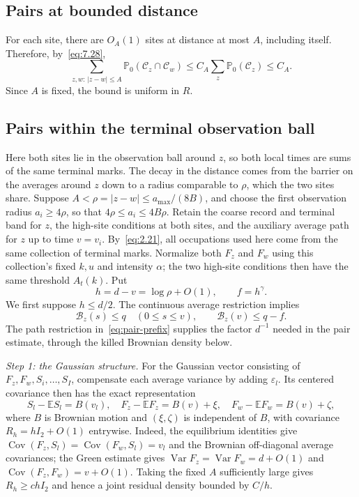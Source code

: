 \documentclass[11pt,letterpaper,reqno]{amsart}
\newif\ifrevmarks \revmarkstrue
\newcommand{\add}[1]{\ifrevmarks\textcolor{revorange}{#1}\else#1\fi}
\numberwithin{equation}{section}
\theoremstyle{remark}
\DeclareMathOperator{\Var}{Var}
\DeclareMathOperator{\Cov}{Cov}
\begin{document}
\subsection{Pairs at bounded distance}\label{sec:neighbors}
For each site, there are $O_A(1)$ sites at distance at most $A$, including itself. Therefore, by~\eqref{eq:7.28},
\begin{equation}\label{eq:9.1}
\sum_{z,w:\,|z-w|\le A}
\mathbb P_0(\mathcal C_z\cap\mathcal C_w)
\le C_A\sum_z\mathbb P_0(\mathcal C_z)\le C_A.
\end{equation}
Since $A$ is fixed, the bound is uniform in $R$.

\subsection{Pairs within the terminal observation ball}\label{sec:latepairs}
\add{Here both sites lie in the observation ball around $z$, so both local times are sums of the same terminal marks. The decay in the distance comes from the barrier on the averages around $z$ down to a radius comparable to $\rho$, which the two sites share.} Suppose $A<\rho=|z-w|\le a_{\max}/(8B)$, and choose the first observation radius $a_i\ge4\rho$, so that $4\rho\le a_i\le4B\rho$. Retain the coarse record and terminal band for $z$, the high-site conditions at both sites, and the auxiliary average path for $z$ up to time $v=v_i$. By~\eqref{eq:2.21}, all occupations used here come from the same collection of terminal marks. Normalize both $F_z$ and $F_w$ using this collection's fixed $k,u$ and intensity $\alpha$; the two high-site conditions then have the same threshold $A_t(k)$. Put
\[
 h=d-v=\log\rho+O(1),\qquad f=h^\gamma.
\]
We first suppose $h\le d/2$. The continuous average restriction implies
\begin{equation}\label{eq:pair-prefix}
 \mathcal B_z(s)\le q\quad(0\le s\le v),\qquad
 \mathcal B_z(v)\le q-f.
\end{equation}
The path restriction in~\eqref{eq:pair-prefix} supplies the factor $d^{-1}$ needed in the pair estimate, through the killed Brownian density below.

\add{\emph{Step 1: the Gaussian structure.}} For the Gaussian vector consisting of $F_z,F_w,S_i,\ldots,S_I$, compensate each average variance by adding $\varepsilon_l$. Its centered covariance then has the exact representation
\begin{equation}\label{eq:pair-brownian}
 S_l-\mathbb ES_l=B(v_l),\quad
 F_z-\mathbb EF_z=B(v)+\xi,\quad
 F_w-\mathbb EF_w=B(v)+\zeta,
\end{equation}
where $B$ is Brownian motion and $(\xi,\zeta)$ is independent of $B$, with covariance $R_h=hI_2+O(1)$ entrywise. Indeed, the equilibrium identities give $\Cov(F_z,S_l)=\Cov(F_w,S_l)=v_l$ and the Brownian off-diagonal average covariances; the Green estimate gives $\Var F_z=\Var F_w=d+O(1)$ and $\Cov(F_z,F_w)=v+O(1)$. Taking the fixed $A$ sufficiently large gives $R_h\ge chI_2$ and hence a joint residual density bounded by $C/h$.
\end{document}
